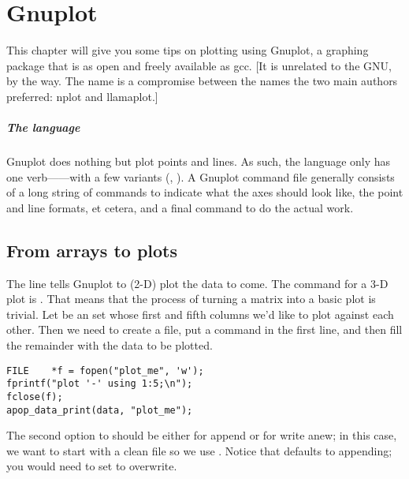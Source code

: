 \chapter{Gnuplot} \label{gnuplot}

This chapter will give you some tips on plotting using Gnuplot, a graphing package that is as
open and freely available as gcc. [It is unrelated to the GNU, by the way. The name is a compromise
between the names the two main authors preferred: nplot and llamaplot.]

\paragraph{The language} Gnuplot does nothing but plot points and
lines. As such, the language only has one verb------with a few variants 
(, ). A Gnuplot command file generally
consists of a long string of  commands to indicate what the
axes should look like, the point and line formats, et cetera, and a
final  command to do the actual work.


\section{From arrays to plots} 
The line  tells Gnuplot to (2-D) plot the data to come. The
command for a 3-D plot is . That means that the process
of turning a matrix into a basic plot is trivial. Let  be an
 set whose first and fifth columns we'd like to plot
against each other. Then we need to create a file, put a  command in the first line, and then fill the remainder with the
data to be plotted.  
\begin{lstlisting}
FILE    *f = fopen("plot_me", 'w');
fprintf("plot '-' using 1:5;\n");
fclose(f);
apop_data_print(data, "plot_me");
\end{lstlisting}
The second option to  should be either  for append or
 for write anew; in this case, we want to start with a clean file so we use .
Notice that  defaults to appending; you
would need to set  to overwrite.

